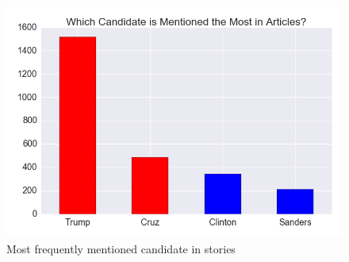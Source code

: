 \documentclass[letterpaper]{article}
\begin{document}

\begin{figure}[t!]  
\centering 
  \includegraphics[width=\columnwidth]{candidate-mentions}  
  \caption{Most frequently mentioned candidate in stories
    \label{fig:tweets-by-pub}}
\end{figure} 
\end{document}
